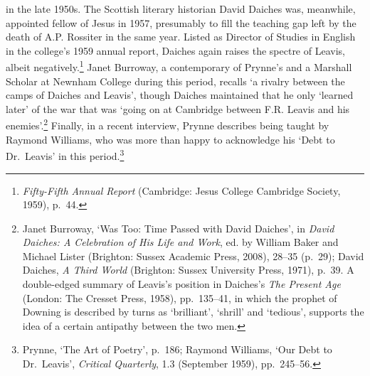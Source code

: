 \documentclass[]{article}
\begin{document}
in the late 1950s. The Scottish literary historian David Daiches was,
meanwhile, appointed fellow of Jesus in 1957, presumably to fill the
teaching gap left by the death of A.P. Rossiter in the same year. Listed
as Director of Studies in English in the college’s 1959 annual report,
Daiches again raises the spectre of Leavis, albeit negatively.\footnote{\emph{Fifty-Fifth
  Annual Report} (Cambridge: Jesus College Cambridge Society, 1959),
  p.~44.} Janet Burroway, a contemporary of Prynne’s and a Marshall
Scholar at Newnham College during this period, recalls ‘a rivalry
between the camps of Daiches and Leavis’, though Daiches maintained that
he only ‘learned later’ of the war that was ‘going on at Cambridge
between F.R. Leavis and his enemies’.\footnote{Janet Burroway, ‘Was Too:
  Time Passed with David Daiches’, in \emph{David Daiches: A Celebration
  of His Life and Work}, ed. by William Baker and Michael Lister
  (Brighton: Sussex Academic Press, 2008), 28–35 (p.~29); David Daiches,
  \emph{A Third World} (Brighton: Sussex University Press, 1971), p.~39.
  A double-edged summary of Leavis’s position in Daiches’s \emph{The
  Present Age} (London: The Cresset Press, 1958), pp.~135–41, in which
  the prophet of Downing is described by turns as ‘brilliant’, ‘shrill’
  and ‘tedious’, supports the idea of a certain antipathy between the
  two men.} Finally, in a recent interview, Prynne describes being
taught by Raymond Williams, who was more than happy to acknowledge his
‘Debt to Dr.~Leavis’ in this period.\footnote{Prynne, ‘The Art of
  Poetry’, p.~186; Raymond Williams, ‘Our Debt to Dr.~Leavis’,
  \emph{Critical Quarterly}, 1.3 (September 1959), pp.~245–56.}
\end{document}

